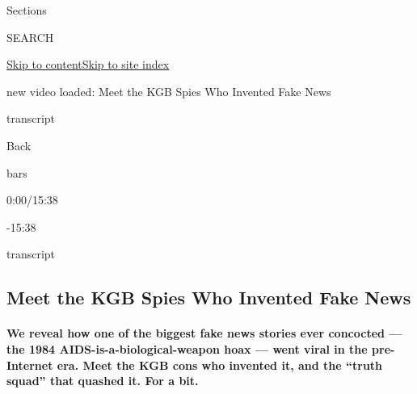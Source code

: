 Sections

SEARCH

\protect\hyperlink{site-content}{Skip to
content}\protect\hyperlink{site-index}{Skip to site index}

new video loaded: Meet the KGB Spies Who Invented Fake News

transcript

Back

bars

0:00/15:38

-15:38

transcript

\hypertarget{meet-the-kgb-spies-who-invented-fake-news}{%
\subsection{Meet the KGB Spies Who Invented Fake
News}\label{meet-the-kgb-spies-who-invented-fake-news}}

\hypertarget{we-reveal-how-one-of-the-biggest-fake-news-stories-ever-concocted--the-1984-aids-is-a-biological-weapon-hoax--went-viral-in-the-pre-internet-era-meet-the-kgb-cons-who-invented-it-and-the-truth-squad-that-quashed-it-for-a-bit}{%
\paragraph{We reveal how one of the biggest fake news stories ever
concocted --- the 1984 AIDS-is-a-biological-weapon hoax --- went viral
in the pre-Internet era. Meet the KGB cons who invented it, and the
``truth squad'' that quashed it. For a
bit.}\label{we-reveal-how-one-of-the-biggest-fake-news-stories-ever-concocted--the-1984-aids-is-a-biological-weapon-hoax--went-viral-in-the-pre-internet-era-meet-the-kgb-cons-who-invented-it-and-the-truth-squad-that-quashed-it-for-a-bit}}


